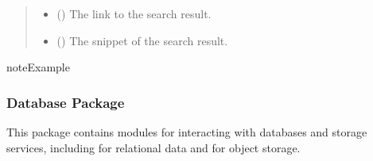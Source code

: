 \documentclass[letterpaper,10pt,english]{sphinxmanual}
\begin{document}
\begin{fulllineitems}
\begin{quote}
\begin{description}
\begin{itemize}
\item {} 
\sphinxAtStartPar
{} () \textendash{} The link to the search result.

\item {} 
\sphinxAtStartPar
{} () \textendash{} The snippet of the search result.

\end{itemize}

\end{description}\end{quote}

\begin{sphinxadmonition}{note}{Example}

\begin{sphinxVerbatim}[commandchars=\\\{\}]
  
    
    
    
    
    
\end{sphinxVerbatim}
\end{sphinxadmonition}

\end{fulllineitems}


\sphinxstepscope


\subsubsection{Database Package}
\label{\detokenize{src.database:database-package}}\label{\detokenize{src.database::doc}}
\sphinxAtStartPar
This package contains modules for interacting with databases and storage services, including  for relational data and  for object storage.
\end{document}
